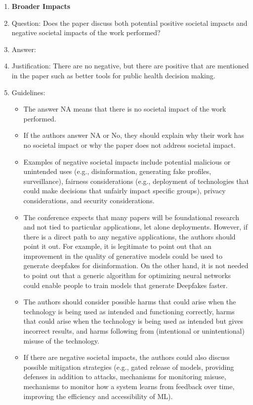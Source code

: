 \documentclass{article}
\begin{document}
\begin{enumerate}
\item {\bf Broader Impacts}
    \item[] Question: Does the paper discuss both potential positive societal impacts and negative societal impacts of the work performed?
    \item[] Answer: \answerYes{} %
    \item[] Justification: There are no negative, but there are positive that are mentioned in the paper such as better tools for public health decision making. 
    \item[] Guidelines:
    \begin{itemize}
        \item The answer NA means that there is no societal impact of the work performed.
        \item If the authors answer NA or No, they should explain why their work has no societal impact or why the paper does not address societal impact.
        \item Examples of negative societal impacts include potential malicious or unintended uses (e.g., disinformation, generating fake profiles, surveillance), fairness considerations (e.g., deployment of technologies that could make decisions that unfairly impact specific groups), privacy considerations, and security considerations.
        \item The conference expects that many papers will be foundational research and not tied to particular applications, let alone deployments. However, if there is a direct path to any negative applications, the authors should point it out. For example, it is legitimate to point out that an improvement in the quality of generative models could be used to generate deepfakes for disinformation. On the other hand, it is not needed to point out that a generic algorithm for optimizing neural networks could enable people to train models that generate Deepfakes faster.
        \item The authors should consider possible harms that could arise when the technology is being used as intended and functioning correctly, harms that could arise when the technology is being used as intended but gives incorrect results, and harms following from (intentional or unintentional) misuse of the technology.
        \item If there are negative societal impacts, the authors could also discuss possible mitigation strategies (e.g., gated release of models, providing defenses in addition to attacks, mechanisms for monitoring misuse, mechanisms to monitor how a system learns from feedback over time, improving the efficiency and accessibility of ML).
    \end{itemize}
    

\end{enumerate}
\end{document}
